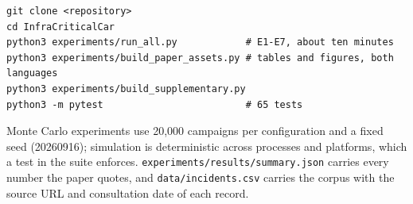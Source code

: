 \documentclass[10pt,a4paper]{article}
\begin{document}
\begin{verbatim}
git clone <repository>
cd InfraCriticalCar
python3 experiments/run_all.py            # E1-E7, about ten minutes
python3 experiments/build_paper_assets.py # tables and figures, both languages
python3 experiments/build_supplementary.py
python3 -m pytest                         # 65 tests
\end{verbatim}

Monte Carlo experiments use 20{,}000 campaigns per configuration and a fixed
seed (20260916); simulation is deterministic across processes and platforms,
which a test in the suite enforces. \texttt{experiments/results/summary.json}
carries every number the paper quotes, and \texttt{data/incidents.csv} carries
the corpus with the source URL and consultation date of each record.
\end{document}
